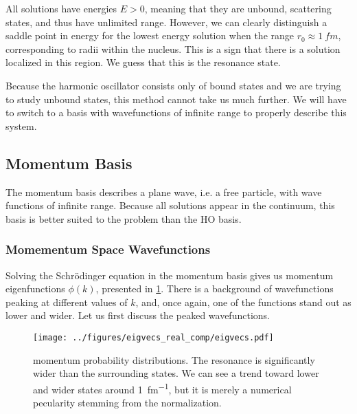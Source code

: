 \documentclass[../main/report.tex]{subfiles}
\begin{document}



All solutions have energies $E > 0$, meaning that they are unbound, scattering states, and thus have unlimited range. 
However, we can clearly distinguish a saddle point in energy for the lowest energy solution when the range $r_0 \approx \SI{1}{fm}$, corresponding to radii within the nucleus.
This is a sign that there is a solution localized in this region.
We guess that this is the resonance state.

Because the harmonic oscillator consists only of bound states and we are trying to study unbound states, this method cannot take us much further.
We will have to switch to a basis with wavefunctions of infinite range to properly describe this system.

\subsection{Momentum Basis}
\label{sub:momentum_basis}

The momentum basis describes a plane wave, i.e. a free particle, with wave functions of infinite range.
Because all  solutions appear in the continuum, this basis is better suited to the problem than the HO basis.

\subsubsection{Momementum Space Wavefunctions}

Solving the Schrödinger equation in the momentum basis gives us momentum eigenfunctions $\phi(k)$, presented in \cref{fig:real_momentum_wavefunctions}.
There is a background of wavefunctions peaking at different values of $k$, and, once again, one of the functions stand out as lower and wider. Let us first discuss the peaked wavefunctions.


\begin{figure}
  \centering
  	\texttt{[image: ../figures/eigvecs\_real\_comp/eigvecs.pdf]}

  \caption{ momentum probability distributions. The resonance is significantly wider than the surrounding states. We can see a trend toward lower and wider states around \SI{1}{fm^{-1}}, but it is merely a numerical pecularity stemming from the normalization.} 
  \label{fig:real_momentum_wavefunctions}
\end{figure}
\end{document}

